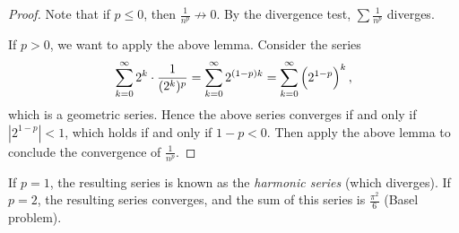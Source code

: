 \begin{example}[$p$-series]
\begin{proof}
Note that if $p\le0$, then $\frac{1}{n^p}\not\to0$. By the divergence test, $\sum\frac{1}{n^p}$ diverges.

If $p>0$, we want to apply the above lemma. Consider the series
\[\sum_{k=0}^{\infty}2^k\cdot\frac{1}{(2^k)^p}=\sum_{k=0}^{\infty}2^{(1-p)k}=\sum_{k=0}^{\infty}\left(2^{1-p}\right)^k,\]
which is a geometric series. Hence the above series converges if and only if $|2^{1-p}|<1$, which holds if and only if $1-p<0$. Then apply the above lemma to conclude the convergence of $\frac{1}{n^p}$.
\end{proof}

\begin{remark}
If $p=1$, the resulting series is known as the \emph{harmonic series} (which diverges). If $p=2$, the resulting series converges, and the sum of this series is $\frac{\pi^2}{6}$ (Basel problem).
\end{remark}
\end{example}

